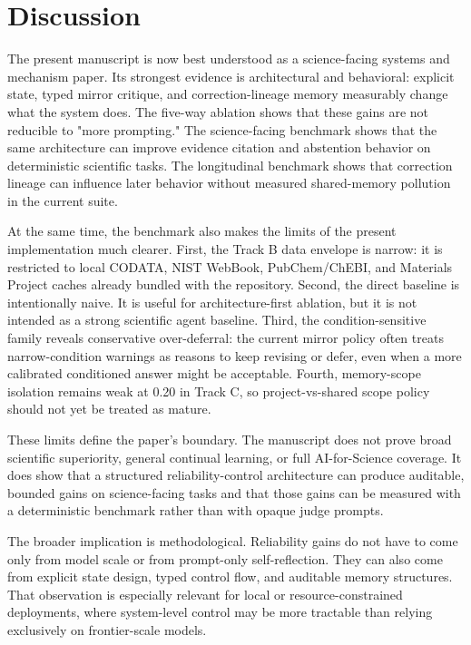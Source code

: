 \documentclass[12pt]{article}
\begin{document}
\section{Discussion}

The present manuscript is now best understood as a science-facing systems and mechanism paper. Its strongest evidence is architectural and behavioral: explicit state, typed mirror critique, and correction-lineage memory measurably change what the system does. The five-way ablation shows that these gains are not reducible to "more prompting." The science-facing benchmark shows that the same architecture can improve evidence citation and abstention behavior on deterministic scientific tasks. The longitudinal benchmark shows that correction lineage can influence later behavior without measured shared-memory pollution in the current suite.

At the same time, the benchmark also makes the limits of the present implementation much clearer. First, the Track B data envelope is narrow: it is restricted to local CODATA, NIST WebBook, PubChem/ChEBI, and Materials Project caches already bundled with the repository. Second, the direct baseline is intentionally naive. It is useful for architecture-first ablation, but it is not intended as a strong scientific agent baseline. Third, the condition-sensitive family reveals conservative over-deferral: the current mirror policy often treats narrow-condition warnings as reasons to keep revising or defer, even when a more calibrated conditioned answer might be acceptable. Fourth, memory-scope isolation remains weak at 0.20 in Track C, so project-vs-shared scope policy should not yet be treated as mature.

These limits define the paper's boundary. The manuscript does not prove broad scientific superiority, general continual learning, or full AI-for-Science coverage. It does show that a structured reliability-control architecture can produce auditable, bounded gains on science-facing tasks and that those gains can be measured with a deterministic benchmark rather than with opaque judge prompts.

The broader implication is methodological. Reliability gains do not have to come only from model scale or from prompt-only self-reflection. They can also come from explicit state design, typed control flow, and auditable memory structures. That observation is especially relevant for local or resource-constrained deployments, where system-level control may be more tractable than relying exclusively on frontier-scale models.
\end{document}
